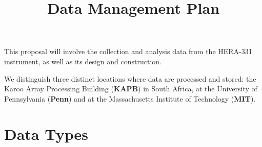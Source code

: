 \documentclass[preprint]{aastex}
\begin{document}
\title{Data Management Plan}

% 


This proposal will involve the collection and analysis data from the HERA-331 instrument, as well as its design and construction.

We distinguish three distinct locations where data are processed and stored: the Karoo Array Processing Building ({\bf KAPB}) in South Africa, at the University of Pennsylvania ({\bf Penn}) and at the Massachusetts Institute of Technology ({\bf MIT}).

\section{Data Types}
\end{document}
